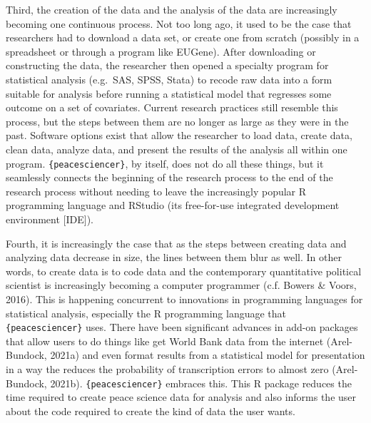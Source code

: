 \documentclass[
  11pt,
]{article}
\begin{document}
Third, the creation of the data and the analysis of the data are increasingly becoming one continuous process. Not too long ago, it used to be the case that researchers had to download a data set, or create one from scratch (possibly in a spreadsheet or through a program like EUGene). After downloading or constructing the data, the researcher then opened a specialty program for statistical analysis (e.g.~SAS, SPSS, Stata) to recode raw data into a form suitable for analysis before running a statistical model that regresses some outcome on a set of covariates. Current research practices still resemble this process, but the steps between them are no longer as large as they were in the past. Software options exist that allow the researcher to load data, create data, clean data, analyze data, and present the results of the analysis all within one program. \texttt{\{peacesciencer\}}, by itself, does not do all these things, but it seamlessly connects the beginning of the research process to the end of the research process without needing to leave the increasingly popular R programming language and RStudio (its free-for-use integrated development environment {[}IDE{]}).

Fourth, it is increasingly the case that as the steps between creating data and analyzing data decrease in size, the lines between them blur as well. In other words, to create data is to code data and the contemporary quantitative political scientist is increasingly becoming a computer programmer (c.f. Bowers \& Voors, 2016). This is happening concurrent to innovations in programming languages for statistical analysis, especially the R programming language that \texttt{\{peacesciencer\}} uses. There have been significant advances in add-on packages that allow users to do things like get World Bank data from the internet (Arel-Bundock, 2021a) and even format results from a statistical model for presentation in a way the reduces the probability of transcription errors to almost zero (Arel-Bundock, 2021b). \texttt{\{peacesciencer\}} embraces this. This R package reduces the time required to create peace science data for analysis and also informs the user about the code required to create the kind of data the user wants.
\end{document}
